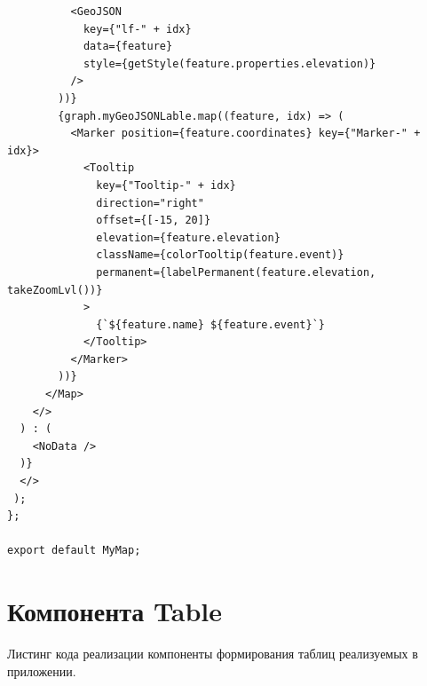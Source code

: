 \begin{lstlisting}
          <GeoJSON
            key={"lf-" + idx}
            data={feature}
            style={getStyle(feature.properties.elevation)}
          />
        ))}
        {graph.myGeoJSONLable.map((feature, idx) => (
          <Marker position={feature.coordinates} key={"Marker-" + idx}>
            <Tooltip
              key={"Tooltip-" + idx}
              direction="right"
              offset={[-15, 20]}
              elevation={feature.elevation}
              className={colorTooltip(feature.event)}
              permanent={labelPermanent(feature.elevation, takeZoomLvl())}
            >
              {`${feature.name} ${feature.event}`}
            </Tooltip>
          </Marker>
        ))}
      </Map>
    </>
  ) : (
    <NoData />
  )}
  </>
 );
};

export default MyMap;

\end{lstlisting}

\chapter{Компонента Table}
\label{appendix:RGTTableGraph}

Листинг кода реализации компоненты формирования таблиц реализуемых в приложении.

